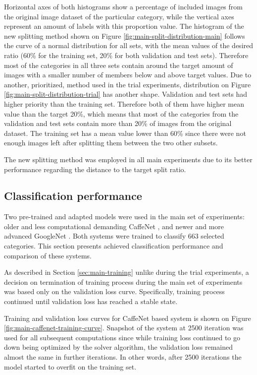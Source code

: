     Horizontal axes of both histograms show a percentage of included images from the original image dataset of the particular category, while the vertical axes represent an amount of labels with this proportion value. The histogram of the new splitting method shown on Figure \ref{fig:main-split-distribution-main} follows the curve of a normal distribution for all sets, with the mean values of the desired ratio (60\% for the training set, 20\% for both validation and test sets). Therefore most of the categories in all three sets contain around the target amount of images with a smaller number of members below and above target values. Due to another, prioritized, method used in the trial experiments, distribution on Figure \ref{fig:main-split-distribution-trial} has another shape. Validation and test sets had higher priority than the training set. Therefore both of them have higher mean value than the target 20\%, which means that most of the categories from the validation and test sets contain more than 20\% of images from the original dataset. The training set has a mean value lower than 60\% since there were not enough images left after splitting them between the two other subsets.
    
    The new splitting method was employed in all main experiments due to its better performance regarding the distance to the target split ratio.

    
\subsection{Classification performance}
    Two pre-trained and adapted models were used in the main set of experiments: older and less computational demanding CaffeNet \cite{CaffeNet}, and newer and more advanced GoogleNet \cite{Szegedy2015GoingDeeper}. Both systems were trained to classify 663 selected categories. This section presents achieved classification performance and comparison of these systems.
    
    As described in Section \ref{sec:main-training} unlike during the trial experiments, a decision on termination of training process during the main set of experiments was based only on the validation loss curve. Specifically, training process continued until validation loss has reached a stable state.
    
    Training and validation loss curves for CaffeNet based system is shown on Figure \ref{fig:main-caffenet-training-curve}. Snapshot of the system at 2500 iteration was used for all subsequent computations since while training loss continued to go down being optimized by the solver algorithm, the validation loss remained almost the same in further iterations. In other words, after 2500 iterations the model started to overfit on the training set.
    
